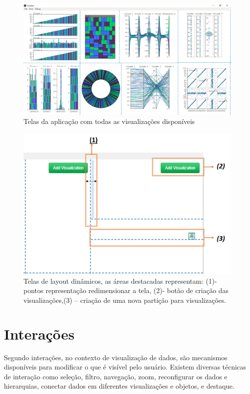 \documentclass[
	12pt,				%
	openright,			%
	oneside,			%
	a4paper,			%
	english,			%
	brazil				%
	]{abntex2}
\begin{document}
\begin{figure}
	\caption{\label{visualizations}  Telas da aplicação com todas as visualizações disponíveis
}
	\begin{center}
	    \includegraphics[width=42pc,size=1]{figures/Capturar1.PNG}
	\end{center}
\end{figure}


\begin{figure}
	\caption{\label{layout_resize}  Telas de layout dinâmicos, as áreas destacadas representam: (1)- pontos representação redimensionar a tela, (2)- botão de criação das visualizações,(3) – criação de uma nova partição para visualizações.
}
	\begin{center}
	    \includegraphics[width=30pc,scale=1]{figures/layouts.png}
	\end{center}
\end{figure}

\section{Interações}
Segundo \cite{ward2010interactive} interações, no contexto de visualização de dados, são mecanismos disponíveis para modificar o que é visível pelo usuário. Existem diversas técnicas de interação como seleção, filtro, navegação, zoom, reconfigurar os dados e hierarquias, conectar dados em diferentes visualizações e objetos, e destaque. 
\end{document}
